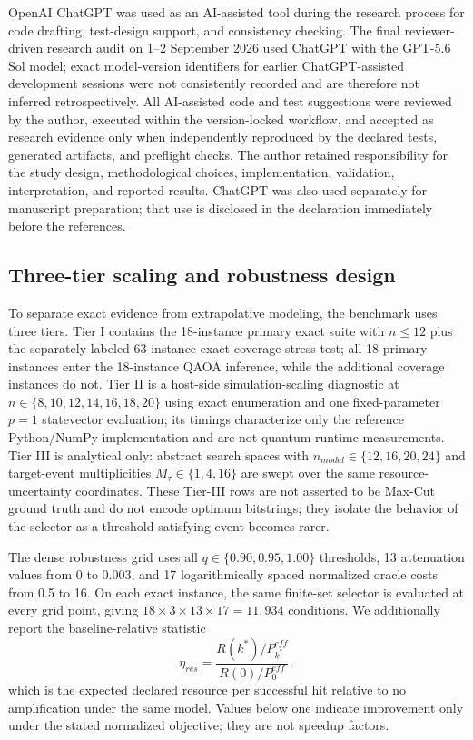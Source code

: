 \documentclass[5p,times]{elsarticle}
\begin{document}
OpenAI ChatGPT was used as an AI-assisted tool during the research process for code drafting, test-design support, and consistency checking. The final reviewer-driven research audit on 1--2 September 2026 used ChatGPT with the GPT-5.6 Sol model; exact model-version identifiers for earlier ChatGPT-assisted development sessions were not consistently recorded and are therefore not inferred retrospectively. All AI-assisted code and test suggestions were reviewed by the author, executed within the version-locked workflow, and accepted as research evidence only when independently reproduced by the declared tests, generated artifacts, and preflight checks. The author retained responsibility for the study design, methodological choices, implementation, validation, interpretation, and reported results. ChatGPT was also used separately for manuscript preparation; that use is disclosed in the declaration immediately before the references.

\subsection{Three-tier scaling and robustness design}
To separate exact evidence from extrapolative modeling, the benchmark uses three tiers. Tier I contains the 18-instance primary exact suite with $n\leq12$ plus the separately labeled 63-instance exact coverage stress test; all 18 primary instances enter the 18-instance QAOA inference, while the additional coverage instances do not. Tier II is a host-side simulation-scaling diagnostic at $n\in\{8,10,12,14,16,18,20\}$ using exact enumeration and one fixed-parameter $p=1$ statevector evaluation; its timings characterize only the reference Python/NumPy implementation and are not quantum-runtime measurements. Tier III is analytical only: abstract search spaces with $n_{model}\in\{12,16,20,24\}$ and target-event multiplicities $M_{\tau}\in\{1,4,16\}$ are swept over the same resource-uncertainty coordinates. These Tier-III rows are not asserted to be Max-Cut ground truth and do not encode optimum bitstrings; they isolate the behavior of the selector as a threshold-satisfying event becomes rarer.

The dense robustness grid uses all $q\in\{0.90,0.95,1.00\}$ thresholds, 13 attenuation values from 0 to 0.003, and 17 logarithmically spaced normalized oracle costs from 0.5 to 16. On each exact instance, the same finite-set selector is evaluated at every grid point, giving $18\times3\times13\times17=11{,}934$ conditions. We additionally report the baseline-relative statistic
\begin{equation}
\eta_{res}=\frac{R(k^*)/P_{k^*}^{eff}}{R(0)/P_0^{eff}},
\end{equation}
which is the expected declared resource per successful hit relative to no amplification under the same model. Values below one indicate improvement only under the stated normalized objective; they are not speedup factors.
\end{document}
